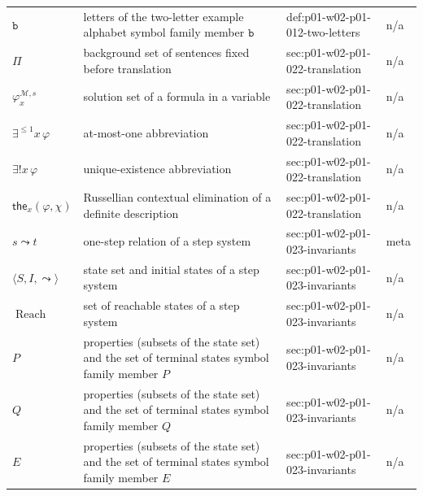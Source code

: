 \begin{longtable}{@{}p{}p{}p{}p{}@{}}
\(\mathtt b\) & letters of the two-letter example alphabet symbol family member \(\mathtt b\) & def:\allowbreak{}p01-\allowbreak{}w02-\allowbreak{}p01-\allowbreak{}012-\allowbreak{}two-\allowbreak{}letters & n/a \\
\(\Pi\) & background set of sentences fixed before translation & sec:\allowbreak{}p01-\allowbreak{}w02-\allowbreak{}p01-\allowbreak{}022-\allowbreak{}translation & n/a \\
\(\varphi^{\mathcal M,s}_x\) & solution set of a formula in a variable & sec:\allowbreak{}p01-\allowbreak{}w02-\allowbreak{}p01-\allowbreak{}022-\allowbreak{}translation & n/a \\
\(\exists^{\leq1}x\,\varphi\) & at-most-one abbreviation & sec:\allowbreak{}p01-\allowbreak{}w02-\allowbreak{}p01-\allowbreak{}022-\allowbreak{}translation & n/a \\
\(\exists!x\,\varphi\) & unique-existence abbreviation & sec:\allowbreak{}p01-\allowbreak{}w02-\allowbreak{}p01-\allowbreak{}022-\allowbreak{}translation & n/a \\
\(\mathsf{the}_x(\varphi,\allowbreak \chi)\) & Russellian contextual elimination of a definite description & sec:\allowbreak{}p01-\allowbreak{}w02-\allowbreak{}p01-\allowbreak{}022-\allowbreak{}translation & n/a \\
\(s\leadsto t\) & one-step relation of a step system & sec:\allowbreak{}p01-\allowbreak{}w02-\allowbreak{}p01-\allowbreak{}023-\allowbreak{}invariants & meta \\
\(\langle S,\allowbreak I,\allowbreak \leadsto\rangle\) & state set and initial states of a step system & sec:\allowbreak{}p01-\allowbreak{}w02-\allowbreak{}p01-\allowbreak{}023-\allowbreak{}invariants & n/a \\
\(\operatorname{Reach}\) & set of reachable states of a step system & sec:\allowbreak{}p01-\allowbreak{}w02-\allowbreak{}p01-\allowbreak{}023-\allowbreak{}invariants & n/a \\
\(P\) & properties (subsets of the state set) and the set of terminal states symbol family member \(P\) & sec:\allowbreak{}p01-\allowbreak{}w02-\allowbreak{}p01-\allowbreak{}023-\allowbreak{}invariants & n/a \\
\(Q\) & properties (subsets of the state set) and the set of terminal states symbol family member \(Q\) & sec:\allowbreak{}p01-\allowbreak{}w02-\allowbreak{}p01-\allowbreak{}023-\allowbreak{}invariants & n/a \\
\(E\) & properties (subsets of the state set) and the set of terminal states symbol family member \(E\) & sec:\allowbreak{}p01-\allowbreak{}w02-\allowbreak{}p01-\allowbreak{}023-\allowbreak{}invariants & n/a \\

\end{longtable}
